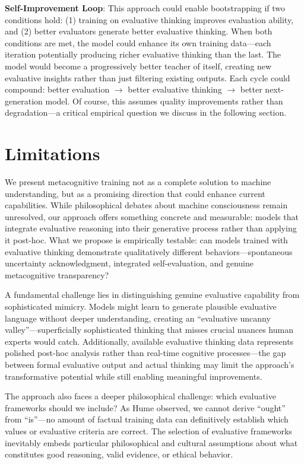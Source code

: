 \documentclass[11pt]{article}
\begin{document}
	\textbf{Self-Improvement Loop}: This approach could enable bootstrapping if two conditions hold: (1) training on evaluative thinking improves evaluation ability, and (2) better evaluators generate better evaluative thinking. When both conditions are met, the model could enhance its own training data---each iteration potentially producing richer evaluative thinking than the last. The model would become a progressively better teacher of itself, creating new evaluative insights rather than just filtering existing outputs. Each cycle could compound: better evaluation $\rightarrow$ better evaluative thinking $\rightarrow$ better next-generation model. Of course, this assumes quality improvements rather than degradation---a critical empirical question we discuss in the following section.
	
	\section{Limitations}
	
	We present metacognitive training not as a complete solution to machine understanding, but as a promising direction that could enhance current capabilities. While philosophical debates about machine consciousness remain unresolved, our approach offers something concrete and measurable: models that integrate evaluative reasoning into their generative process rather than applying it post-hoc. What we propose is empirically testable: can models trained with evaluative thinking demonstrate qualitatively different behaviors—spontaneous uncertainty acknowledgment, integrated self-evaluation, and genuine metacognitive transparency?
	
	A fundamental challenge lies in distinguishing genuine evaluative capability from sophisticated mimicry. Models might learn to generate plausible evaluative language without deeper understanding, creating an ``evaluative uncanny valley''---superficially sophisticated thinking that misses crucial nuances human experts would catch. Additionally, available evaluative thinking data represents polished post-hoc analysis rather than real-time cognitive processes---the gap between formal evaluative output and actual thinking may limit the approach's transformative potential while still enabling meaningful improvements.
	
	The approach also faces a deeper philosophical challenge: which evaluative frameworks should we include? As Hume observed, we cannot derive ``ought'' from ``is''---no amount of factual training data can definitively establish which values or evaluative criteria are correct. The selection of evaluative frameworks inevitably embeds particular philosophical and cultural assumptions about what constitutes good reasoning, valid evidence, or ethical behavior.
	
\end{document}
